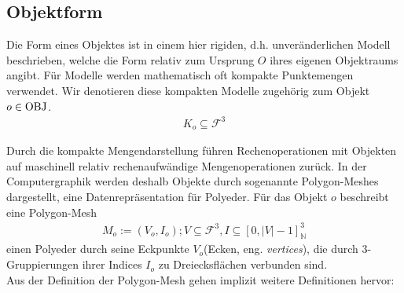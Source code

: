 \subsection{Objektform}
\label{sec:object_form}
Die Form eines Objektes ist in einem hier rigiden, d.h. unveränderlichen Modell beschrieben, welche die Form relativ zum Ursprung $O$ ihres eigenen Objektraums angibt.
Für Modelle werden mathematisch oft kompakte Punktemengen verwendet. Wir denotieren diese kompakten Modelle zugehörig zum Objekt $o \in \operatorname{OBJ}$.
\begin{align}
K_o \subseteq \mathcal{F}^3
\end{align}

Durch die kompakte Mengendarstellung führen Rechenoperationen mit Objekten auf maschinell relativ rechenaufwändige Mengenoperationen zurück. In der Computergraphik werden deshalb Objekte durch sogenannte Polygon-Meshes dargestellt, eine Datenrepräsentation für Polyeder. 
Für das Objekt $o$ beschreibt eine Polygon-Mesh 
\begin{align}
M_o := (V_o, I_o); V \subseteq \mathcal{F}^3, I \subseteq [0, |V|-1]_\mathbb{N}^3 
\end{align}
einen Polyeder durch seine Eckpunkte $V_o$(Ecken, eng. \textit{vertices}), die durch 3-Gruppierungen ihrer Indices $I_o$ zu Dreiecksflächen verbunden sind.\\
Aus der Definition der Polygon-Mesh gehen implizit weitere Definitionen hervor:

